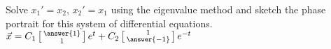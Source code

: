 \documentclass{ximera}
\begin{document}
\begin{exercise}%
    Solve $x_1' = x_2$, $x_2' = x_1$ using the eigenvalue method and sketch the phase portrait for this system of differential equations.\\
    $\vec{x} = C_1 \left[ \begin{smallmatrix}
        \answer{1} \\ 1
    \end{smallmatrix}\right] e^{t}
    + C_2 
    \left[ \begin{smallmatrix}
        1 \\ \answer{-1}
    \end{smallmatrix}\right] e^{-t}$
\end{exercise}
\end{document}
